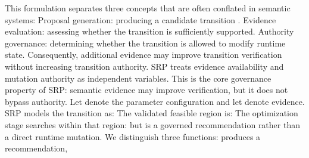 {}This formulation separates three concepts that are often conflated in semantic systems:\markdownRendererInterblockSeparator
{}\markdownRendererOlBeginTight
{}Proposal generation: producing a candidate transition .\markdownRendererOlItemEnd 
{}Evidence evaluation: assessing whether the transition is sufficiently supported.\markdownRendererOlItemEnd 
{}Authority governance: determining whether the transition is allowed to modify runtime state.\markdownRendererOlItemEnd 
\markdownRendererOlEndTight \markdownRendererInterblockSeparator
{}Consequently, additional evidence may improve transition verification without increasing transition authority. SRP treats evidence availability and mutation authority as independent variables.\markdownRendererParagraphSeparator
{}This is the core governance property of SRP: semantic evidence may improve verification, but it does not bypass authority.\markdownRendererInterblockSeparator
{}
\markdownRendererSectionEnd \markdownRendererSectionBegin
{}\markdownRendererInterblockSeparator
{}Let  denote the parameter configuration and let  denote evidence. SRP models the transition as:\markdownRendererInterblockSeparator
{}\markdownRendererInterblockSeparator
{}The validated feasible region is:\markdownRendererInterblockSeparator
{}\markdownRendererInterblockSeparator
{}The optimization stage searches within that region:\markdownRendererInterblockSeparator
{}\markdownRendererInterblockSeparator
{}but  is a governed recommendation rather than a direct runtime mutation.\markdownRendererParagraphSeparator
{}We distinguish three functions:\markdownRendererInterblockSeparator
{}\markdownRendererInterblockSeparator
{}produces a recommendation,\markdownRendererInterblockSeparator
{}\markdownRendererInterblockSeparator
